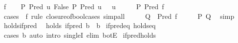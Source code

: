 \begin{isabellebody}
\ f\isanewline
\ \ \isamarkupfalse%
\ {\isachardoublequoteopen}P\ {\isacharparenleft}{\kern0pt}Pred\ {\isacharparenleft}{\kern0pt}{\isasymlambda}u{\isachardot}{\kern0pt}\ False{\isacharparenright}{\kern0pt}{\isacharparenright}{\kern0pt}{\isachardoublequoteclose}\ {\isachardoublequoteopen}P\ {\isacharparenleft}{\kern0pt}Pred\ {\isacharparenleft}{\kern0pt}{\isasymlambda}u{\isachardot}{\kern0pt}\ {\isacharparenleft}{\kern0pt}{\isacharparenright}{\kern0pt}\ {\isacharequal}{\kern0pt}\ u{\isacharparenright}{\kern0pt}{\isacharparenright}{\kern0pt}{\isachardoublequoteclose}\isanewline
\ \ \isamarkupfalse%
\ \isamarkupfalse%
\ {\isachardoublequoteopen}P\ {\isacharparenleft}{\kern0pt}Pred\ f{\isacharparenright}{\kern0pt}{\isachardoublequoteclose}\ \isanewline
\ \ \ \ \isamarkupfalse%
\ {\isacharparenleft}{\kern0pt}cases\ {\isacharunderscore}{\kern0pt}\ f\ rule{\isacharcolon}{\kern0pt}\ closure{\isacharunderscore}{\kern0pt}of{\isacharunderscore}{\kern0pt}bool{\isacharunderscore}{\kern0pt}cases{\isacharparenright}{\kern0pt}\ simp{\isacharunderscore}{\kern0pt}all\isanewline
\ \ \isamarkupfalse%
\ \isamarkupfalse%
\ {\isachardoublequoteopen}Q\ {\isacharequal}{\kern0pt}\ Pred\ f{\isachardoublequoteclose}\isanewline
\ \ \isamarkupfalse%
\ \isamarkupfalse%
\ {\isachardoublequoteopen}P\ Q{\isachardoublequoteclose}\ \isamarkupfalse%
\ simp\isanewline
{}\isamarkupfalse%
%
\endisatagproof
{\isafoldproof}%
%
\isadelimproof
\isanewline
%
\endisadelimproof
\ \ \isanewline
{}\isamarkupfalse%
\ holds{\isacharunderscore}{\kern0pt}if{\isacharunderscore}{\kern0pt}pred{\isacharcolon}{\kern0pt}\isanewline
\ \ {\isachardoublequoteopen}holds\ {\isacharparenleft}{\kern0pt}if{\isacharunderscore}{\kern0pt}pred\ b{\isacharparenright}{\kern0pt}\ {\isacharequal}{\kern0pt}\ b{\isachardoublequoteclose}\isanewline
%
\isadelimproof
%
\endisadelimproof
%
\isatagproof
{}\isamarkupfalse%
\ if{\isacharunderscore}{\kern0pt}pred{\isacharunderscore}{\kern0pt}eq\ holds{\isacharunderscore}{\kern0pt}eq\isanewline
{}\isamarkupfalse%
\ {\isacharparenleft}{\kern0pt}cases\ b{\isacharparenright}{\kern0pt}\ {\isacharparenleft}{\kern0pt}auto\ intro{\isacharcolon}{\kern0pt}\ singleI\ elim{\isacharcolon}{\kern0pt}\ botE{\isacharparenright}{\kern0pt}%
\endisatagproof
{\isafoldproof}%
%
\isadelimproof
\isanewline
%
\endisadelimproof
\isanewline
{}\isamarkupfalse%
\ if{\isacharunderscore}{\kern0pt}pred{\isacharunderscore}{\kern0pt}holds{\isacharcolon}{\kern0pt}\isanewline

\end{isabellebody}
